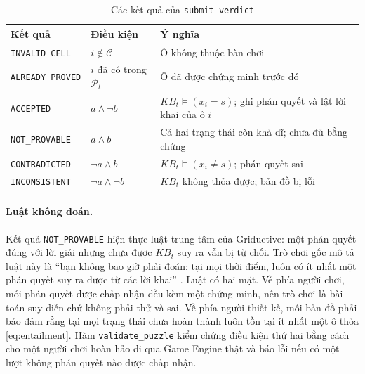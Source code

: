 \begin{table}[htbp]
  \centering
  \caption{Các kết quả của \texttt{submit\_verdict}}
  \label{tab:submit_outcome}
  \begin{tabularx}{\textwidth}{ll>{\raggedright\arraybackslash}X}
    \toprule
    \textbf{Kết quả} & \textbf{Điều kiện} & \textbf{Ý nghĩa} \\
    \midrule
    \texttt{INVALID\_CELL}   & $i \notin \mathcal{C}$          & Ô không thuộc bàn chơi \\
    \texttt{ALREADY\_PROVED} & $i$ đã có trong $\mathcal{P}_t$ & Ô đã được chứng minh trước đó \\
    \texttt{ACCEPTED}        & $a \land \neg b$                & $\mathit{KB}_t \models (x_i = s)$; ghi phán quyết và lật lời khai của ô $i$ \\
    \texttt{NOT\_PROVABLE}   & $a \land b$                     & Cả hai trạng thái còn khả dĩ; chưa đủ bằng chứng \\
    \texttt{CONTRADICTED}    & $\neg a \land b$                & $\mathit{KB}_t \models (x_i \ne s)$; phán quyết sai \\
    \texttt{INCONSISTENT}    & $\neg a \land \neg b$           & $\mathit{KB}_t$ không thỏa được; bản đồ bị lỗi \\
    \bottomrule
  \end{tabularx}
\end{table}

\paragraph{Luật không đoán.}
Kết quả \texttt{NOT\_PROVABLE} hiện thực luật trung tâm của Griductive: một phán
quyết đúng với lời giải nhưng chưa được $\mathit{KB}_t$ suy ra vẫn bị từ chối.
Trò chơi gốc mô tả luật này là ``bạn không bao giờ phải đoán: tại mọi thời
điểm, luôn có ít nhất một phán quyết suy ra được từ các lời khai''
\cite{griductive_rules}. Luật có hai mặt. Về phía người chơi, mỗi phán quyết
được chấp nhận đều kèm một chứng minh, nên trò chơi là bài toán suy diễn chứ
không phải thử và sai. Về phía người thiết kế, mỗi bản đồ phải bảo đảm rằng tại
mọi trạng thái chưa hoàn thành luôn tồn tại ít nhất một ô thỏa
\eqref{eq:entailment}. Hàm \texttt{validate\_puzzle} kiểm chứng điều kiện thứ
hai bằng cách cho một người chơi hoàn hảo đi qua Game Engine thật và báo lỗi
nếu có một lượt không phán quyết nào được chấp nhận.
